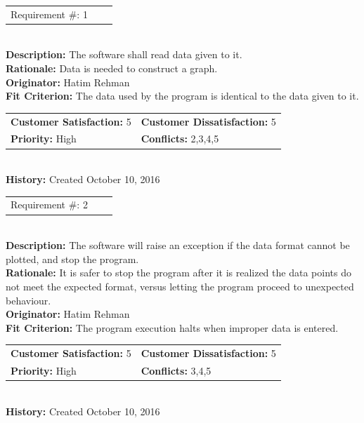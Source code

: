 \documentclass[12pt, titlepage]{article}
\begin{document}
\begin{reqbox}
\begin{tabular}{ccc}Requirement \#: 1
\end{tabular} \\
\textbf{Description:} The software shall read data given to it.\\
\textbf{Rationale:} Data is needed to construct a graph. \\
\textbf{Originator:} Hatim Rehman \\
\textbf{Fit Criterion:} The data used by the program is identical to the data given to it.\\
\begin{tabular}{ll}
\textbf{Customer Satisfaction:} 5 & \textbf{Customer Dissatisfaction:} 5 \\
\textbf{Priority:} High & \textbf{Conflicts:} 2,3,4,5\\
\end{tabular} \\
\textbf{History:} Created October 10, 2016
\end{reqbox}

\begin{reqbox}
\begin{tabular}{ccc}Requirement \#: 2
\end{tabular} \\
\textbf{Description:} The software will raise an exception if the data format cannot be plotted, and stop the program. \\
\textbf{Rationale:} It is safer to stop the program after it is realized the data points do not meet the expected format, versus letting the program proceed to unexpected behaviour. \\
\textbf{Originator:} Hatim Rehman \\
\textbf{Fit Criterion:} The program execution halts when improper data is entered.\\
\begin{tabular}{ll}
\textbf{Customer Satisfaction:} 5 & \textbf{Customer Dissatisfaction:} 5 \\
\textbf{Priority:} High & \textbf{Conflicts:} 3,4,5\\
\end{tabular} \\
\textbf{History:} Created October 10, 2016
\end{reqbox}
\end{document}
